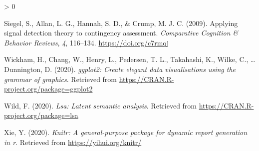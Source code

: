 \documentclass[
  english,
  man,floatsintext]{apa6}
\newlength{\cslhangindent}
\newenvironment{CSLReferences}[2] %
 {%
  \setlength{\parindent}{0pt}
  \ifodd #1 \everypar{\setlength{\hangindent}{\cslhangindent}}\ignorespaces\fi
  \ifnum #2 > 0
  \setlength{\parskip}{#2\baselineskip}
  \fi
 }%
 {}
\begin{document}
\begin{CSLReferences}{1}{0}
\leavevmode\hypertarget{ref-siegelApplyingSignalDetection2009}{}%
Siegel, S., Allan, L. G., Hannah, S. D., \& Crump, M. J. C. (2009). Applying signal detection theory to contingency assessment. \emph{Comparative Cognition \& Behavior Reviews}, \emph{4}, 116--134. \url{https://doi.org/c7rmqj}

\leavevmode\hypertarget{ref-R-ggplot2}{}%
Wickham, H., Chang, W., Henry, L., Pedersen, T. L., Takahashi, K., Wilke, C., \ldots{} Dunnington, D. (2020). \emph{ggplot2: Create elegant data visualisations using the grammar of graphics}. Retrieved from \url{https://CRAN.R-project.org/package=ggplot2}

\leavevmode\hypertarget{ref-R-lsa}{}%
Wild, F. (2020). \emph{Lsa: Latent semantic analysis}. Retrieved from \url{https://CRAN.R-project.org/package=lsa}

\leavevmode\hypertarget{ref-R-knitr}{}%
Xie, Y. (2020). \emph{Knitr: A general-purpose package for dynamic report generation in r}. Retrieved from \url{https://yihui.org/knitr/}

\end{CSLReferences}

\endgroup


\clearpage
\makeatletter
\efloat@restorefloats
\makeatother
\end{document}

